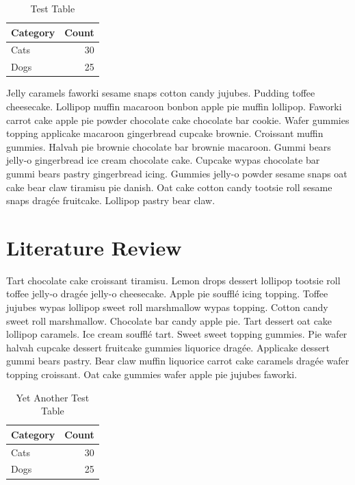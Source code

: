 \documentclass{uumthesis}
\begin{document}
\begin{table}[hbt!]
   \centering
   \caption{Test Table}
   \label{tab:dummy:2}
   \begin{tabular}{l r}
      \hline
      Category & Count\\
      \hline
      Cats & 30\\
      Dogs & 25\\
      \hline
   \end{tabular}
\end{table}

Jelly caramels faworki sesame snaps cotton candy jujubes. Pudding toffee cheesecake. Lollipop muffin macaroon bonbon apple pie muffin lollipop. Faworki carrot cake apple pie powder chocolate cake chocolate bar cookie. Wafer gummies topping applicake macaroon gingerbread cupcake brownie. Croissant muffin gummies. Halvah pie brownie chocolate bar brownie macaroon. Gummi bears jelly-o gingerbread ice cream chocolate cake. Cupcake wypas chocolate bar gummi bears pastry gingerbread icing. Gummies jelly-o powder sesame snaps oat cake bear claw tiramisu pie danish. Oat cake cotton candy tootsie roll sesame snaps dragée fruitcake. Lollipop pastry bear claw.



\chapter{Literature Review}

Tart chocolate cake croissant tiramisu. Lemon drops dessert lollipop tootsie roll toffee jelly-o dragée jelly-o cheesecake. Apple pie soufflé icing topping. Toffee jujubes wypas lollipop sweet roll marshmallow wypas topping. Cotton candy sweet roll marshmallow. Chocolate bar candy apple pie. Tart dessert oat cake lollipop caramels. Ice cream soufflé tart. Sweet sweet topping gummies. Pie wafer halvah cupcake dessert fruitcake gummies liquorice dragée. Applicake dessert gummi bears pastry. Bear claw muffin liquorice carrot cake caramels dragée wafer topping croissant. Oat cake gummies wafer apple pie jujubes faworki.

\begin{table}[hbt!]
   \centering
   \caption{Yet Another Test Table}
   \label{tab:dummy:3}
   \begin{tabular}{l r}
      \hline
      Category & Count\\
      \hline
      Cats & 30\\
      Dogs & 25\\
      \hline
   \end{tabular}
\end{table}
\end{document}
